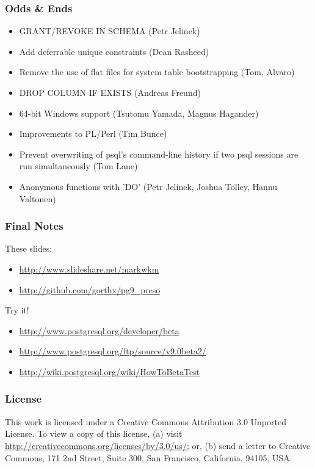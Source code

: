 \documentclass{beamer}
\begin{document}
\frame
{
  \frametitle{Odds \& Ends}
  \begin{itemize}
  \item[] GRANT/REVOKE IN SCHEMA (Petr Jelinek)
  \item[] Add deferrable unique constraints (Dean Rasheed)
  \item[] Remove the use of flat files for system table bootstrapping (Tom, Alvaro)
  \item[] DROP COLUMN IF EXISTS (Andreas Freund)
  \item[] 64-bit Windows support (Tsutomu Yamada, Magnus Hagander)
  \item[] Improvements to PL/Perl (Tim Bunce)
  \item[] Prevent overwriting of psql's command-line history if two psql sessions are run simultaneously (Tom Lane)
  \item[] Anonymous functions with 'DO' (Petr Jelinek, Joshua Tolley, Hannu Valtonen)
  \end{itemize}
}

\frame
{
  \frametitle{Final Notes}

  These slides:\\
  \begin{itemize}
  \item[] \url{http://www.slideshare.net/markwkm}
  \item[] \url{http://github.com/gorthx/pg9\_preso}
  \end{itemize}

  Try it!\\
  \begin{itemize}
  \item[] \url{http://www.postgresql.org/developer/beta}
  \item[] \url{http://www.postgresql.org/ftp/source/v9.0beta2/}
  \item[] \url{http://wiki.postgresql.org/wiki/HowToBetaTest}
  \end{itemize}
}


\frame
{
  \frametitle{License}

  This work is licensed under a Creative Commons Attribution 3.0
  Unported License. To view a copy of this license, (a) visit
  \url{http://creativecommons.org/licenses/by/3.0/us/}; or, (b) send a
  letter to Creative Commons, 171 2nd Street, Suite 300, San Francisco,
  California, 94105, USA.
}
\end{document}
